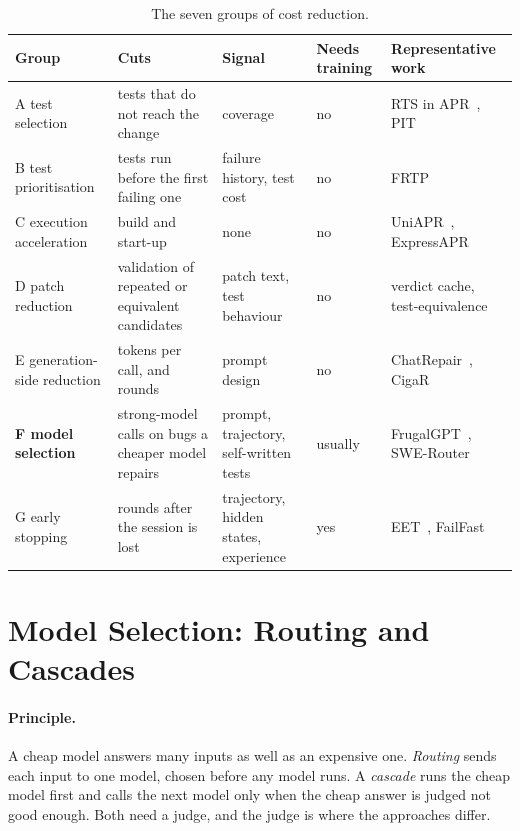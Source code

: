 \begin{table}[htbp]
\centering
\caption{The seven groups of cost reduction.}
\label{tab:rel-taxonomy}
\footnotesize
\begin{tabularx}{\textwidth}{@{}>{\raggedright\arraybackslash}p{} >{\raggedright\arraybackslash}p{} >{\raggedright\arraybackslash}p{} >{\raggedright\arraybackslash}p{} >{\raggedright\arraybackslash}X@{}}
\toprule
Group & Cuts & Signal & Needs training & Representative work\\
\midrule
A test selection & tests that do not reach the change & coverage & no & RTS in APR~\citep{lou2024aprregression}, PIT~\citep{coles2016pit}\\
B test prioritisation & tests run before the first failing one & failure history, test cost & no & FRTP~\citep{qi2013frtp}\\
C execution acceleration & build and start-up & none & no & UniAPR~\citep{chen2021uniapr}, ExpressAPR~\citep{xiao2024expressapr}\\
D patch reduction & validation of repeated or equivalent candidates & patch text, test behaviour & no & verdict cache, test-equivalence~\citep{mechtaev2018testequivalence}\\
E generation-side reduction & tokens per call, and rounds & prompt design & no & ChatRepair~\citep{xia2024chatrepair}, CigaR~\citep{hidvegi2024cigar}\\
\textbf{F model selection} & strong-model calls on bugs a cheaper model repairs & prompt, trajectory, self-written tests & usually & FrugalGPT~\citep{chen2023frugalgpt}, SWE-Router~\citep{son2026swerouter}\\
G early stopping & rounds after the session is lost & trajectory, hidden states, experience & yes & EET~\citep{guo2026eet}, FailFast~\citep{wang2026failfast}\\
\bottomrule
\end{tabularx}
\end{table}

\section{Model Selection: Routing and Cascades}
\label{sec:rel-f}

\paragraph{Principle.} A cheap model answers many inputs as well as an
expensive one. \emph{Routing} sends each input to one model, chosen before any
model runs. A \emph{cascade} runs the cheap model first and calls the next
model only when the cheap answer is judged not good enough. Both need a judge,
and the judge is where the approaches differ.

